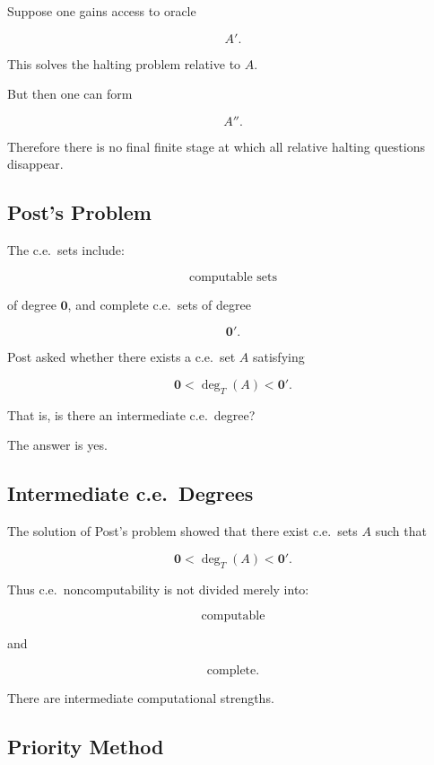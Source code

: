 Suppose one gains access to oracle

\[
A'.
\]

This solves the halting problem relative to \(A\).

But then one can form

\[
\boxed{
A''.
}
\]

Therefore there is no final finite stage at which all relative halting
questions disappear.

\subsection{Post's Problem}
\label{subsec:posts-problem}

The c.e.\ sets include:

\[
\boxed{
\text{computable sets}
}
\]

of degree \(\mathbf{0}\), and complete c.e.\ sets of degree

\[
\boxed{
\mathbf{0}'.
}
\]

Post asked whether there exists a c.e.\ set \(A\) satisfying

\[
\boxed{
\mathbf{0}
<
\deg_T(A)
<
\mathbf{0}'.
}
\]

That is, is there an intermediate c.e.\ degree?

The answer is yes.

\subsection{Intermediate c.e.\ Degrees}
\label{subsec:intermediate-ce-degrees}

The solution of Post's problem showed that there exist c.e.\ sets \(A\)
such that

\[
\boxed{
\mathbf{0}
<
\deg_T(A)
<
\mathbf{0}'.
}
\]

Thus c.e.\ noncomputability is not divided merely into:

\[
\boxed{
\text{computable}
}
\]

and

\[
\boxed{
\text{complete}.
}
\]

There are intermediate computational strengths.

\subsection{Priority Method}
\label{subsec:priority-method}

